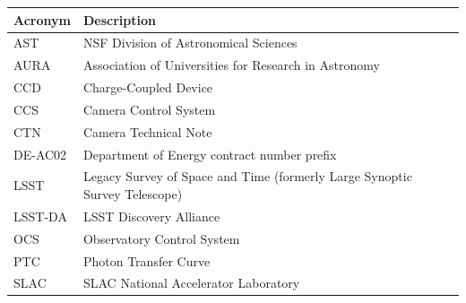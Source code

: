 \addtocounter{table}{-1}
\begin{longtable}{p{}p{}}\hline
\textbf{Acronym} & \textbf{Description}  \\\hline

AST & NSF Division of Astronomical Sciences \\\hline
AURA & Association of Universities for Research in Astronomy \\\hline
CCD & Charge-Coupled Device \\\hline
CCS & Camera Control System \\\hline
CTN & Camera Technical Note \\\hline
DE-AC02 & Department of Energy contract number prefix \\\hline
LSST & Legacy Survey of Space and Time (formerly Large Synoptic Survey Telescope) \\\hline
LSST-DA & LSST Discovery Alliance \\\hline
OCS & Observatory Control System \\\hline
PTC & Photon Transfer Curve \\\hline
SLAC & SLAC National Accelerator Laboratory \\\hline
\end{longtable}
